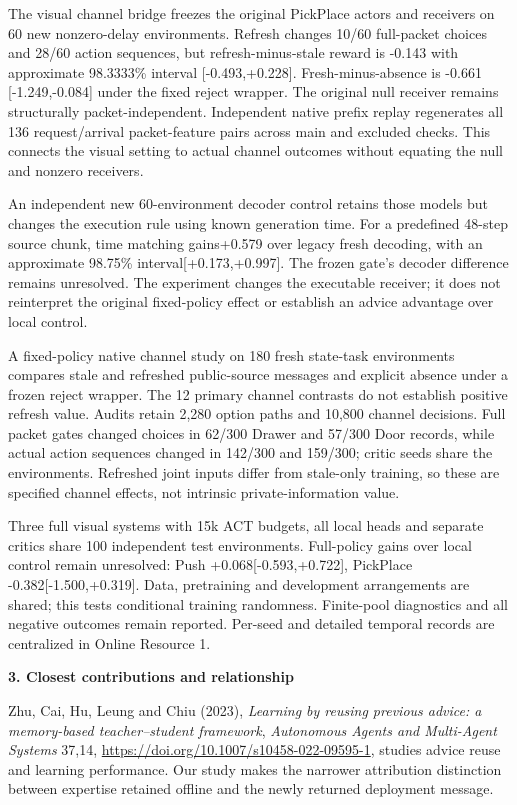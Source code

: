 \documentclass[11pt,a4paper]{article}
\begin{document}
The visual channel bridge freezes the original PickPlace actors and receivers on 60 new nonzero-delay environments. Refresh changes 10/60 full-packet choices and 28/60 action sequences, but refresh-minus-stale reward is -0.143 with approximate 98.3333\% interval [-0.493,+0.228]. Fresh-minus-absence is -0.661 [-1.249,-0.084] under the fixed reject wrapper. The original null receiver remains structurally packet-independent. Independent native prefix replay regenerates all 136 request/arrival packet-feature pairs across main and excluded checks. This connects the visual setting to actual channel outcomes without equating the null and nonzero receivers.

An independent new 60-environment decoder control retains those models but changes the execution rule using known generation time. For a predefined 48-step source chunk, time matching gains+0.579 over legacy fresh decoding, with an approximate 98.75\% interval[+0.173,+0.997]. The frozen gate's decoder difference remains unresolved. The experiment changes the executable receiver; it does not reinterpret the original fixed-policy effect or establish an advice advantage over local control.

A fixed-policy native channel study on 180 fresh state-task environments compares stale and refreshed public-source messages and explicit absence under a frozen reject wrapper. The 12 primary channel contrasts do not establish positive refresh value. Audits retain 2,280 option paths and 10,800 channel decisions. Full packet gates changed choices in 62/300 Drawer and 57/300 Door records, while actual action sequences changed in 142/300 and 159/300; critic seeds share the environments. Refreshed joint inputs differ from stale-only training, so these are specified channel effects, not intrinsic private-information value.

Three full visual systems with 15k ACT budgets, all local heads and separate critics share 100 independent test environments. Full-policy gains over local control remain unresolved: Push +0.068[-0.593,+0.722], PickPlace -0.382[-1.500,+0.319]. Data, pretraining and development arrangements are shared; this tests conditional training randomness. Finite-pool diagnostics and all negative outcomes remain reported. Per-seed and detailed temporal records are centralized in Online Resource 1.

\textbf{3. Closest contributions and relationship}

Zhu, Cai, Hu, Leung and Chiu (2023), \emph{Learning by reusing previous advice: a memory-based teacher--student framework}, \emph{Autonomous Agents and Multi-Agent Systems} 37,14, \url{https://doi.org/10.1007/s10458-022-09595-1}, studies advice reuse and learning performance. Our study makes the narrower attribution distinction between expertise retained offline and the newly returned deployment message.
\end{document}
